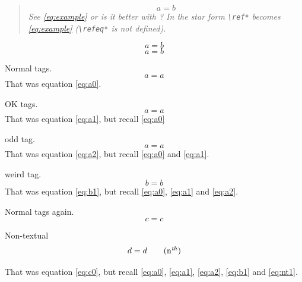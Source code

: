 \documentclass{article}
\begin{document}
\begin{quote}\renewcommand*\rmdefault{ppl}\normalfont\itshape
\begin{equation*}
a=b \label{eq:example}\tag*{Q\&A}
\end{equation*}
See \ref{eq:example} or is it better with ?
In the star form \verb|\ref*| becomes \ref*{eq:example} (\verb|\refeq*| is not defined).
\end{quote}

\begin{equation*}
a=b \label{eq:example2}\tag*{Q\&A}
\end{equation*}
\begin{equation*}
a=b \label{eq:example3}\tag{Q\&A}
\end{equation*}

Normal tags.
\begin{equation}
a=a\label{eq:a0}
\end{equation}
That was equation \eqref{eq:a0}.

OK tags.
\begin{equation}
a=a\label{eq:a1}
\end{equation}
That was equation \eqref{eq:a1}, but recall \eqref{eq:a0}

odd tag.
\begin{equation}
a=a\label{eq:a2}
\end{equation}
That was equation \eqref{eq:a2}, but recall \eqref{eq:a0} and \eqref{eq:a1}.

weird tag.
\begin{equation}
b=b\label{eq:b1}
\end{equation}
That was equation \eqref{eq:b1}, but recall \eqref{eq:a0}, \eqref{eq:a1} and \eqref{eq:a2}.

Normal tags again.
\begin{equation}
c=c\label{eq:c0}
\end{equation}

Non-textual
\begin{equation}
d=d \label{eq:nt1}\tag{n$^{\mathit{th}}$}
\end{equation}

That was equation \eqref{eq:c0}, but recall \eqref{eq:a0}, \eqref{eq:a1}, \eqref{eq:a2},
\eqref{eq:b1} and \eqref{eq:nt1}.
\end{document}
